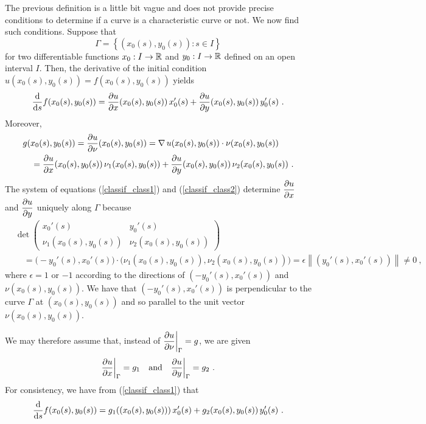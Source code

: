 The previous definition is a little bit vague and does not provide precise
conditions to determine if a curve is a characteristic curve or not.
We now find such conditions.  Suppose that
\begin{equation} \label{classif_GammaEq1}
\Gamma = \left\{ (x_0(s), y_0(s)) : s \in I \right\}
\end{equation}
for two differentiable functions $x_0:I\rightarrow \RR$ and
$y_0:I\rightarrow \RR$ defined on an open interval $I$.
Then, the derivative of the initial condition
$u(x_0(s),y_0(s)) = f(x_0(s),y_0(s))$ yields
\begin{equation} \label{classif_class1}
\dfdx{f(x_0(s),y_0(s))}{s} =
\pdydx{u}{x}(x_0(s),y_0(s))\,x_0'(s) + \pdydx{u}{y}(x_0(s),y_0(s))\,
y_0'(s) \ .
\end{equation}
Moreover,
\begin{align}
&g(x_0(s),y_0(s)) = \pdydx{u}{\nu}(x_0(s),y_0(s))
= \graD u(x_0(s),y_0(s)) \cdot
\nu(x_0(s),y_0(s)) \nonumber \\
&\quad = \pdydx{u}{x}(x_0(s),y_0(s))\,\nu_1(x_0(s),y_0(s)) +
\pdydx{u}{y}(x_0(s),y_0(s))\,\nu_2(x_0(s),y_0(s)) \ .
\label{classif_class2}
\end{align}
The system of equations (\ref{classif_class1}) and
(\ref{classif_class2}) determine $\displaystyle \pdydx{u}{x}$ and 
$\displaystyle \pdydx{u}{y}$ uniquely along $\Gamma$ because
\begin{align*}
&\det
\begin{pmatrix}
x_0'(s) & y_0'(s) \\
\nu_1(x_0(s),y_0(s)) & \nu_2(x_0(s),y_0(s))
\end{pmatrix} \\
&\quad = \big(-y_0'(s),x_0'(s)\big)\cdot \big(\nu_1(x_0(s),y_0(s)),
\nu_2(x_0(s),y_0(s))\big) = \epsilon \left\|(y_0'(s),x_0'(s))\right\|
\neq  0  \ ,
\end{align*}
where $\epsilon = 1$ or $-1$ according to the directions of
$(-y_0'(s),x_0'(s))$ and $\nu(x_0(s),y_0(s))$.  We have that
$(-y_0'(s),x_0'(s))$ is perpendicular to the curve $\Gamma$ at
$(x_0(s),y_0(s))$ and so parallel to the unit vector
$\nu(x_0(s),y_0(s))$.

We may therefore assume that, instead of
$\displaystyle \pdydx{u}{\nu}\bigg|_\Gamma = g$, we are given
\begin{equation} \label{classif_class3}
\pdydx{u}{x}\bigg|_\Gamma = g_1 \quad \text{and} \quad 
\pdydx{u}{y}\bigg|_\Gamma = g_2 \ .
\end{equation}
For consistency, we have from (\ref{classif_class1}) that
\[
\dfdx{f(x_0(s),y_0(s))}{s} =
g_1((x_0(s),y_0(s)))\,x_0'(s) + g_2(x_0(s),y_0(s))\, y_0'(s) \ .
\]

